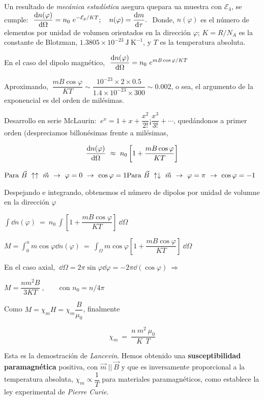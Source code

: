 Un resultado de \emph{mecánica estadística} asegura quepara ua muestra con $\mathcal E_4$, se cumple:
$\ \displaystyle \dv{n(\varphi)}{\Omega}=n_0\ e^{-\mathcal E_p / KT}; \quad n(\varphi)=\dv{m}{\tau}.\ $ Donde, $n(\varphi)$ es el número de elementos por unidad de volumen orientados en la dirección $\varphi$; $K=R/N_A$ es la constante de Blotzman, $1.3805\times 10^{-23}\ \mathrm{J\ K}^{-1}$, y $T$ es la temperatura absoluta.

En el caso del dipolo magnético, $\ \displaystyle \dv{n(\varphi)}{\Omega}= n_0\ e^{mB\cos \varphi / KT}$

Aproximando, $\ \dfrac{mB\cos \varphi}{KT} \sim \dfrac{10^{-23}\times 2 \times 0.5}{1.4\times 10^{-23} \times 300} \sim 0.002$, o sea, el argumento de la exponencial es del orden de milésimas.

Desarrollo en serie McLaurin: $\ e^x=1+x+\dfrac{x^2}{2!}¡\dfrac{x^3}{3!}+\cdots$, quedándonos a primer orden (despreciamos billonésimas frente a milésimas,

$$\displaystyle \dv{n(\varphi)}{\Omega} \ \approx \ n_0 \left[ 1 + \dfrac {mB\cos \varphi}{KT} \right]$$

$ \text{Para } \vec B \ \uparrow \uparrow \ \vec m \ \to \  \varphi=0 \ \to \ \cos \varphi = 1 \\
\text{Para } \vec B \ \uparrow \downarrow \ \vec m \ \to \  \varphi=\pi \ \to \ \cos \varphi = -1 $

Despejando e integrando, obtenemos el número de dipolos por unidad de volumne en la dirección $\varphi$

$\displaystyle \int \dd n(\varphi) \ = \ n_0\ \int \left[ 1 + \dfrac {mB\cos \varphi}{KT} \right] \ \dd \Omega$

$\displaystyle M=\int_0^n  m \cos \varphi \dd n(\varphi) \ = \ \int_\Omega m \cos \varphi \left[ 1 + \dfrac {mB\cos \varphi}{KT} \right] \ \dd \Omega$

En el caso axial, $\ \dd \Omega = 2\pi \sin \varphi \dd \varphi = -2\pi \dd (\cos \varphi) \ \Rightarrow $

$ M=\dfrac{nm^2B}{3KT}\ , \qquad \text{con } n_0=n/4\pi$

Como $M=\chi_m H=\chi_m \dfrac B {\mu_0}$, finalmente

$$\chi_m \ = \ \dfrac {n\ m^2 \ \mu_0}{K \ \ T}$$

Esta es la demostración de \emph{Lancevin}. Hemos obtenido una \textbf{susceptibilidad paramagnética} positiva, con $\vec m \ || \ \vec B$ y que es inversamente proporcional a la temperatura absoluta, $\chi_m \propto \dfrac 1 T$ para materiales paramagnéticos, como establece la ley experimental de \emph{Pierre Curie}.

